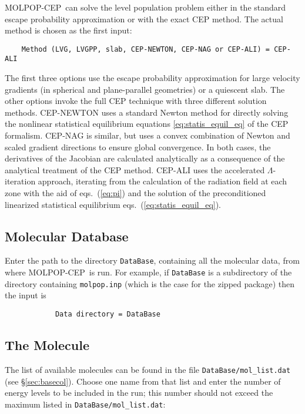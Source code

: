 \documentclass[12pt]{article}
\def\separation {0.5cm}
\def\M{MOLPOP-CEP}
\begin{document}
\M\ can solve the level population problem either in the standard escape
probability approximation or with the exact CEP method. The actual method is
chosen as the first input:

\vspace{\separation}
\begin{verbatim}
    Method (LVG, LVGPP, slab, CEP-NEWTON, CEP-NAG or CEP-ALI) = CEP-ALI
\end{verbatim}
The first three options use the escape probability approximation for large
velocity gradients (in spherical and plane-parallel geometries) or a quiescent slab. The other options invoke the full CEP
technique with three different solution methods. CEP-NEWTON uses a standard
Newton method for directly solving the nonlinear statistical equilibrium
equations \ref{eq:statis_equil_eq} of the CEP formalism. CEP-NAG is similar,
but uses a convex combination of Newton and scaled gradient directions to
ensure global convergence. In both cases, the derivatives of the Jacobian are
calculated analytically as a consequence of the analytical treatment of the CEP
method. CEP-ALI uses the accelerated $\Lambda$-iteration approach, iterating
from the calculation of the radiation field at each zone with the aid of eqs.\
(\ref{eq:pi}) and the solution of the preconditioned linearized statistical
equilibrium eqs.\ (\ref{eq:statis_equil_eq}).

\subsection{Molecular Database}

Enter the path to the directory {\tt DataBase}, containing all the molecular
data, from where \M\ is run. For example, if {\tt DataBase} is a subdirectory
of the directory containing \texttt{molpop.inp} (which is the case for the
zipped package) then the input is

\vspace{\separation}
\begin{verbatim}
            Data directory = DataBase
\end{verbatim}

\subsection{The Molecule}

The list of available molecules can be found in the file
\texttt{DataBase/mol\_list.dat} (see \S\ref{sec:basecol}). Choose one name
from that list and enter the number of energy levels to be included in the run;
this number should not exceed the maximum listed in
\texttt{DataBase/mol\_list.dat}:
\end{document}

